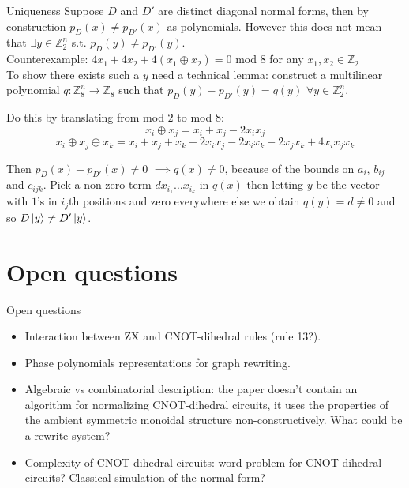 \documentclass{beamer}
\theoremstyle{definition}
\begin{document}
\begin{frame}{Uniqueness}
Suppose $D$ and $D'$ are distinct diagonal normal forms, then by construction $p_D(x) \neq p_{D'}(x)$ as polynomials. However this does not mean that $\exists y \in \mathbb{Z}_2^n$ s.t. $p_D(y) \neq p_{D'}(y)$.\\

Counterexample: $4x_1 + 4x_2 + 4(x_1 \oplus x_2) = 0$ mod $8$ for any $x_1, x_2 \in \mathbb{Z}_2$\\

To show there exists such a $y$ need a technical lemma: construct a multilinear polynomial $q : \mathbb{Z}_8^n \rightarrow \mathbb{Z}_8$ such that $p_D(y)- p_{D'}(y) = q(y)$ $\forall y \in \mathbb{Z}_2^n$.

Do this by translating from mod $2$ to mod $8$:
$$ x_i \oplus x_j = x_i + x_j -2x_ix_j $$
$$ x_i \oplus x_j \oplus x_k = x_i + x_j + x_k -2x_ix_j -2x_ix_k -2x_jx_k + 4x_ix_jx_k$$

Then $p_D(x) - p_{D'}(x) \neq 0$ $\implies q(x) \neq 0$, because of the bounds on $a_i$, $b_{ij}$ and $c_{ijk}$. Pick a non-zero term $d x_{i_1} \dots x_{i_k}$ in $q(x)$ then letting $y$ be the vector with $1$'s in $i_j$th positions and zero everywhere else we obtain $q(y) = d \neq 0$ and so $D\ket{y} \neq D' \ket{y}$.
\end{frame}

\section{Open questions}
\begin{frame}{Open questions}
	\begin{itemize}
		\item Interaction between ZX and CNOT-dihedral rules (rule 13?).
		\item Phase polynomials representations for graph rewriting.
		\item Algebraic vs combinatorial description: the paper doesn't contain an algorithm for normalizing CNOT-dihedral circuits, it uses the properties of the ambient symmetric monoidal structure non-constructively. What could be a rewrite system?
		\item Complexity of CNOT-dihedral circuits: word problem for CNOT-dihedral circuits? Classical simulation of the normal form?
	\end{itemize}
\end{frame}
\end{document}
